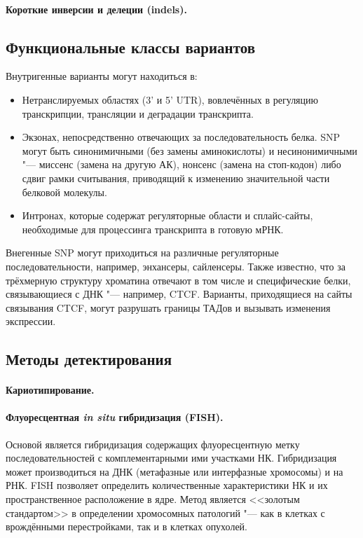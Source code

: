 \documentclass[a4paper,12pt]{article}
\begin{document}
\paragraph{Короткие инверсии и делеции (indels).}

\subsection{Функциональные классы вариантов}

Внутригенные варианты могут находиться в:

\begin{itemize}
\item Нетранслируемых областях (3' и 5' UTR), вовлечённых в регуляцию транскрипции, трансляции и деградации транскрипта.
\item Экзонах, непосредственно отвечающих за последовательность белка.
SNP могут быть синонимичными (без замены аминокислоты) и несинонимичными "--- миссенс (замена на другую АК), нонсенс (замена на стоп-кодон) либо сдвиг рамки считывания, приводящий к изменению значительной части белковой молекулы.
\item Интронах, которые содержат регуляторные области и сплайс-сайты, необходимые для процессинга транскрипта в готовую мРНК.
\end{itemize}

Внегенные SNP могут приходиться на различные регуляторные последовательности, например, энхансеры, сайленсеры.
Также известно, что за трёхмерную структуру хроматина отвечают в том числе и специфические белки, связывающиеся с ДНК "--- например, CTCF\cite{wutz}.
Варианты, приходящиеся на сайты связывания CTCF, могут разрушать границы ТАДов и вызывать изменения экспрессии.

\subsection{Методы детектирования}

\paragraph{Кариотипирование.}

\paragraph{Флуоресцентная \textit{in situ} гибридизация (FISH).}
Основой является гибридизация содержащих флуоресцентную метку последовательностей с комплементарными ими участками НК.
Гибридизация может производиться на ДНК (метафазные или интерфазные хромосомы) и на РНК.
FISH позволяет определить количественные характеристики НК и их пространственное расположение в ядре.
Метод является <<золотым стандартом>> в определении хромосомных патологий "--- как в клетках с врождёнными перестройками, так и в клетках опухолей.
\end{document}

